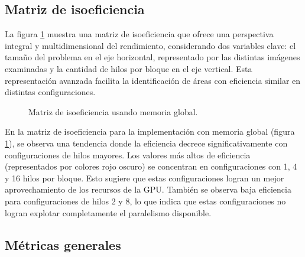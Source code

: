         
    \subsection{Matriz de isoeficiencia}

        La figura \ref{fig:convisoeficiency_global} muestra una  matriz de isoeficiencia que ofrece una perspectiva integral y multidimensional del rendimiento, considerando dos variables clave: el tamaño del problema en el eje horizontal, representado por las distintas imágenes examinadas y la cantidad de hilos por bloque en el eje vertical. Esta representación avanzada facilita la identificación de áreas con eficiencia similar en distintas configuraciones.

        \begin{figure}[H]
            \centering
            \caption{Matriz de isoeficiencia usando memoria global.}
            \label{fig:convisoeficiency_global}
        \end{figure}  

        En la matriz de isoeficiencia para la implementación con memoria global (figura \ref{fig:convisoeficiency_global}), se observa una tendencia donde la eficiencia decrece significativamente con configuraciones de hilos mayores. Los valores más altos de eficiencia (representados por colores rojo oscuro) se concentran en configuraciones con 1, 4 y 16 hilos por bloque. Esto sugiere que estas configuraciones logran un mejor aprovechamiento de los recursos de la GPU. También se observa baja eficiencia para configuraciones de hilos 2 y 8, lo que indica que estas configuraciones no logran explotar completamente el paralelismo disponible.

    \subsection{Métricas generales}

